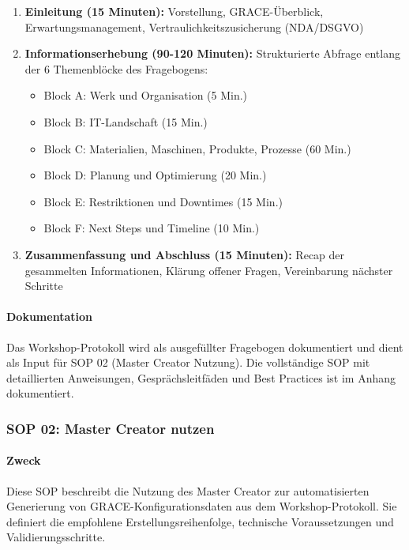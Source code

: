 \begin{enumerate}
    \item \textbf{Einleitung (15 Minuten):} Vorstellung, GRACE-Überblick, Erwartungsmanagement, Vertraulichkeitszusicherung (NDA/DSGVO)

    \item \textbf{Informationserhebung (90-120 Minuten):} Strukturierte Abfrage entlang der 6 Themenblöcke des Fragebogens:
    \begin{itemize}
        \item Block A: Werk und Organisation (5 Min.)
        \item Block B: IT-Landschaft (15 Min.)
        \item Block C: Materialien, Maschinen, Produkte, Prozesse (60 Min.)
        \item Block D: Planung und Optimierung (20 Min.)
        \item Block E: Restriktionen und Downtimes (15 Min.)
        \item Block F: Next Steps und Timeline (10 Min.)
    \end{itemize}

    \item \textbf{Zusammenfassung und Abschluss (15 Minuten):} Recap der gesammelten Informationen, Klärung offener Fragen, Vereinbarung nächster Schritte
\end{enumerate}

\paragraph{Dokumentation}

Das Workshop-Protokoll wird als ausgefüllter Fragebogen dokumentiert und dient als Input für SOP 02 (Master Creator Nutzung). Die vollständige SOP mit detaillierten Anweisungen, Gesprächsleitfäden und Best Practices ist im Anhang dokumentiert.

\subsubsection{SOP 02: Master Creator nutzen}

\paragraph{Zweck}

Diese SOP beschreibt die Nutzung des Master Creator zur automatisierten Generierung von GRACE-Konfigurationsdaten aus dem Workshop-Protokoll. Sie definiert die empfohlene Erstellungsreihenfolge, technische Voraussetzungen und Validierungsschritte.

